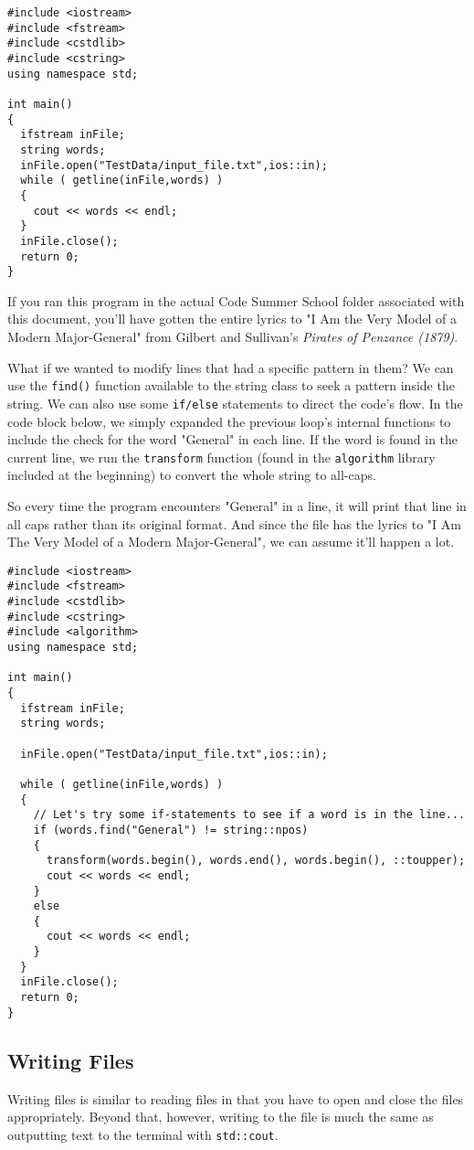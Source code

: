\begin{verbatim}
#include <iostream>
#include <fstream>
#include <cstdlib>
#include <cstring>
using namespace std;

int main()
{
  ifstream inFile;
  string words;
  inFile.open("TestData/input_file.txt",ios::in);
  while ( getline(inFile,words) )
  {
    cout << words << endl;
  }
  inFile.close();
  return 0;
}
\end{verbatim}

If you ran this program in the actual Code Summer School folder associated with this document, you'll have gotten the entire lyrics to "I Am the Very Model of a Modern Major-General" from Gilbert and Sullivan's \textit{Pirates of Penzance (1879)}.

What if we wanted to modify lines that had a specific pattern in them?
We can use the \texttt{find()} function available to the string class to seek a pattern inside the string.  We can also use some \texttt{if/else} statements to direct the code's flow.  In the code block below, we simply expanded the previous loop's internal functions to include the check for the word "General" in each line.  If the word is found in the current line, we run the \texttt{transform} function (found in the \texttt{algorithm} library included at the beginning) to convert the whole string to all-caps.

So every time the program encounters "General" in a line, it will print that line in all caps rather than its original format.  And since the file has the lyrics to "I Am The Very Model of a Modern Major-General", we can assume it'll happen a lot.

\begin{verbatim}
#include <iostream>
#include <fstream>
#include <cstdlib>
#include <cstring>
#include <algorithm>
using namespace std;

int main()
{
  ifstream inFile;
  string words;
  
  inFile.open("TestData/input_file.txt",ios::in);

  while ( getline(inFile,words) )
  {
    // Let's try some if-statements to see if a word is in the line...
    if (words.find("General") != string::npos)
    {
      transform(words.begin(), words.end(), words.begin(), ::toupper);
      cout << words << endl;
    }
    else
    {
      cout << words << endl;
    }
  }
  inFile.close();
  return 0;
}
\end{verbatim}

\subsection*{Writing Files}
Writing files is similar to reading files in that you have to open and close the files appropriately.  Beyond that, however, writing to the file is much the same as outputting text to the terminal with \texttt{std::cout}.

